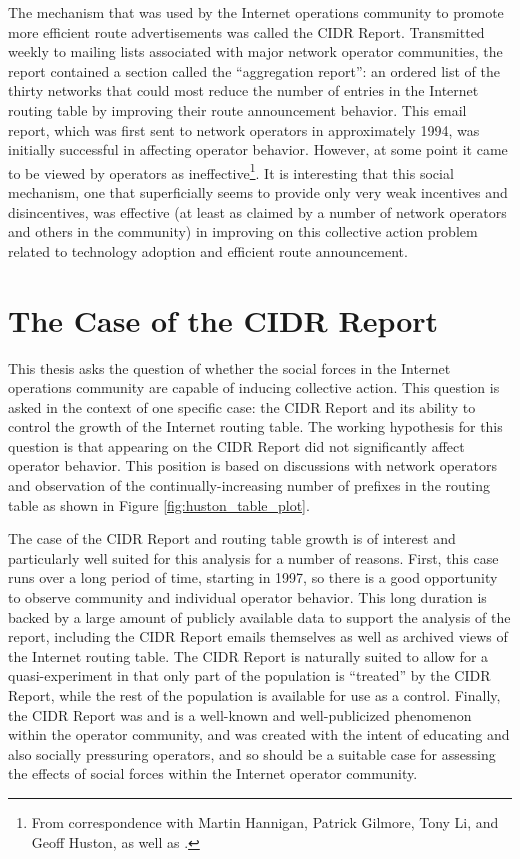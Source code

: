 The mechanism that was used by the Internet operations community to promote more efficient route advertisements was called the CIDR Report. Transmitted weekly to mailing lists associated with major network operator communities, the report contained a section called the ``aggregation report'': an ordered list of the thirty networks that could most reduce the number of entries in the Internet routing table by improving their route announcement behavior. This email report, which was first sent to network operators in approximately 1994, was initially successful in affecting operator behavior. However, at some point it came to be viewed by operators as ineffective\footnote{From correspondence with Martin Hannigan, Patrick Gilmore, Tony Li, and Geoff Huston, as well as \cite{Steenbergen:2010nx}.}. It is interesting that this social mechanism, one that superficially seems to provide only very weak incentives and disincentives, was effective (at least as claimed by a number of network operators and others in the community) in improving on this collective action problem related to technology adoption and efficient route announcement.

\section{The Case of the CIDR Report}

This thesis asks the question of whether the social forces in the Internet operations community are capable of inducing collective action. This question is asked in the context of one specific case: the CIDR Report and its ability to control the growth of the Internet routing table. The working hypothesis for this question is that appearing on the CIDR Report did not significantly affect operator behavior. This position is based on discussions with network operators and observation of the continually-increasing number of prefixes in the routing table as shown in Figure \ref{fig:huston_table_plot}.

The case of the CIDR Report and routing table growth is of interest and particularly well suited for this analysis for a number of reasons. First, this case runs over a long period of time, starting in 1997, so there is a good opportunity to observe community and individual operator behavior. This long duration is backed by a large amount of publicly available data to support the analysis of the report, including the CIDR Report emails themselves as well as archived views of the Internet routing table. The CIDR Report is naturally suited to allow for a quasi-experiment in that only part of the population is ``treated'' by the CIDR Report, while the rest of the population is available for use as a control. Finally, the CIDR Report was and is a well-known and well-publicized phenomenon within the operator community, and was created with the intent of educating and also socially pressuring operators, and so should be a suitable case for assessing the effects of social forces within the Internet operator community.

